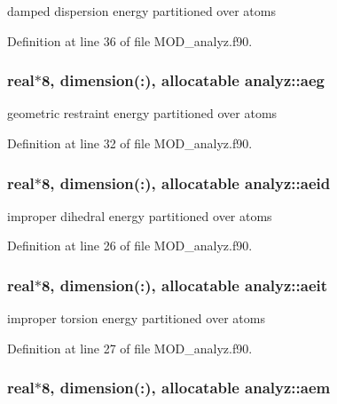 damped dispersion energy partitioned over atoms 



Definition at line 36 of file M\-O\-D\-\_\-analyz.\-f90.

\hypertarget{classanalyz_a1e1a7a2111e6f4702533d6deb15a5751}{
\subsubsection[{aeg}]{\setlength{\rightskip}{0pt plus 5cm}real$\ast$8, dimension(\-:), allocatable analyz\-::aeg}}\label{classanalyz_a1e1a7a2111e6f4702533d6deb15a5751}


geometric restraint energy partitioned over atoms 



Definition at line 32 of file M\-O\-D\-\_\-analyz.\-f90.

\hypertarget{classanalyz_af8f4812410c86c689b41c11d48c9f2d5}{
\subsubsection[{aeid}]{\setlength{\rightskip}{0pt plus 5cm}real$\ast$8, dimension(\-:), allocatable analyz\-::aeid}}\label{classanalyz_af8f4812410c86c689b41c11d48c9f2d5}


improper dihedral energy partitioned over atoms 



Definition at line 26 of file M\-O\-D\-\_\-analyz.\-f90.

\hypertarget{classanalyz_ae0dc531ebf4d305c50c00ce58da3e06f}{
\subsubsection[{aeit}]{\setlength{\rightskip}{0pt plus 5cm}real$\ast$8, dimension(\-:), allocatable analyz\-::aeit}}\label{classanalyz_ae0dc531ebf4d305c50c00ce58da3e06f}


improper torsion energy partitioned over atoms 



Definition at line 27 of file M\-O\-D\-\_\-analyz.\-f90.

\hypertarget{classanalyz_a3a36c16946fae85aa6fa8857979a7ad7}{
\subsubsection[{aem}]{\setlength{\rightskip}{0pt plus 5cm}real$\ast$8, dimension(\-:), allocatable analyz\-::aem}}\label{classanalyz_a3a36c16946fae85aa6fa8857979a7ad7}


